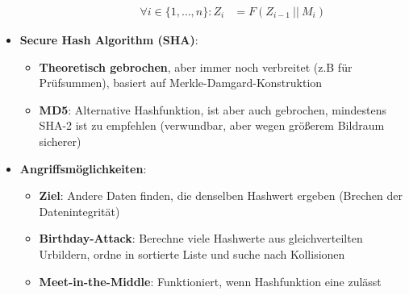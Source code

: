 \begin{itemize}
\begin{itemize}
\begin{enumerate}
\begin{align*}
				\forall i \in \{1, \dots, n\}: Z_i &= F(Z_{i-1}\ ||\ M_i)
			\end{align*}
		\end{enumerate}
	\end{itemize}
	\item \textbf{Secure Hash Algorithm (SHA)}:
	\begin{itemize}
		\item \textbf{Theoretisch gebrochen}, aber immer noch verbreitet (z.B für Prüfsummen), basiert auf Merkle-Damgard-Konstruktion
		\item \textbf{MD5}: Alternative Hashfunktion, ist aber auch gebrochen, mindestens SHA-2 ist zu empfehlen (verwundbar, aber wegen größerem Bildraum sicherer)
	\end{itemize}
	\item \textbf{Angriffsmöglichkeiten}:
	\begin{itemize}
		\item \textbf{Ziel}: Andere Daten finden, die denselben Hashwert ergeben (Brechen der Datenintegrität)
		\item \textbf{Birthday-Attack}: Berechne viele Hashwerte aus gleichverteilten Urbildern, ordne in sortierte Liste und suche nach Kollisionen
		\item \textbf{Meet-in-the-Middle}: Funktioniert, wenn Hashfunktion eine  zulässt
	\end{itemize}
\end{itemize}